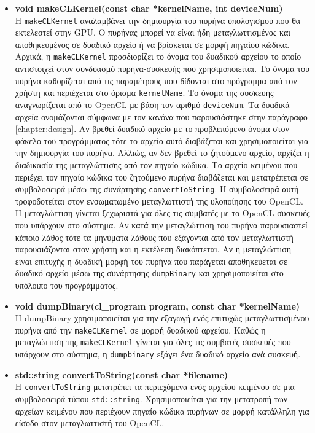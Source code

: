 \begin{itemize}
\item \textbf{void makeCLKernel(const char *kernelName, int deviceNum)}\\ 
Η \verb!makeCLKernel! αναλαμβάνει την δημιουργία του πυρήνα υπολογισμού που θα εκτελεστεί στην GPU. Ο πυρήνας μπορεί να είναι ήδη μεταγλωττισμένος και αποθηκευμένος σε δυαδικό αρχείο ή να βρίσκεται σε μορφή πηγαίου κώδικα. Αρχικά, η \verb!makeCLKernel! προσδιορίζει το όνομα του δυαδικού αρχείου το οποίο αντιστοιχεί στον συνδυασμό πυρήνα-συσκευής που χρησιμοποιείται. Το όνομα του πυρήνα καθορίζεται από τις παραμέτρους που δίδονται στο πρόγραμμα από τον χρήστη και περιέχεται στο όρισμα \verb!kernelName!. Το όνομα της συσκευής αναγνωρίζεται από το OpenCL με βάση τον αριθμό \verb!deviceNum!. Τα δυαδικά αρχεία  ονομάζονται σύμφωνα με τον κανόνα που παρουσιάστηκε στην παράγραφο \ref{chapter:design}. Αν βρεθεί δυαδικό αρχείο με το προβλεπόμενο όνομα στον φάκελο του προγράμματος τότε το αρχείο αυτό διαβάζεται και χρησιμοποιείται για την δημιουργία του πυρήνα. Αλλιώς, αν δεν βρεθεί το ζητούμενο αρχείο, αρχίζει η διαδικασία της μεταγλώττισης από τον πηγαίο κώδικα. Το αρχείο κειμένου που περιέχει τον πηγαίο κώδικα του 
ζητούμενο πυρήνα διαβάζεται και μετατρέπεται σε συμβολοσειρά μέσω της συνάρτησης \verb!convertToString!. Η συμβολοσειρά αυτή τροφοδοτείται στον ενσωματωμένο μεταγλωττιστή της υλοποίησης του OpenCL. Η μεταγλώττιση γίνεται ξεχωριστά για όλες τις συμβατές με το OpenCL συσκευές που υπάρχουν στο σύστημα. Αν κατά την μεταγλώττιση του πυρήνα παρουσιαστεί κάποιο λάθος τότε τα μηνύματα λάθους που εξάγονται από τον μεταγλωττιστή παρουσιάζονται στον χρήστη και η εκτέλεση διακόπτεται. Αν η μεταγλώττιση είναι επιτυχής η δυαδική μορφή του πυρήνα που παράγεται αποθηκεύεται σε δυαδικό αρχείο μέσω της συνάρτησης \verb!dumpBinary! και χρησιμοποιείται στο υπόλοιπο του προγράμματος.


\item \textbf{void dumpBinary(cl\_program program, const char *kernelName)}\\ 
Η dumpBinary χρησιμοποιείται για την εξαγωγή ενός επιτυχώς μεταγλωττισμένου πυρήνα από την \verb!makeCLKernel! σε μορφή δυαδικού αρχείου. Καθώς η μεταγλώττιση της \verb!makeCLKernel! γίνεται για όλες τις συμβατές συσκευές που υπάρχουν στο σύστημα, η \verb!dumpbinary! εξάγει ένα δυαδικό αρχείο ανά συσκευή.

\item \textbf{std::string convertToString(const char *filename)}\\ 
Η \verb!convertToString! μετατρέπει τα περιεχόμενα ενός αρχείου κειμένου σε μια συμβολοσειρά τύπου \verb!std::string!. Χρησιμοποιείται για την μετατροπή των αρχείων κειμένου που περιέχουν πηγαίο κώδικα πυρήνων σε μορφή κατάλληλη για είσοδο στον μεταγλωττιστή του OpenCL.



\end{itemize}
